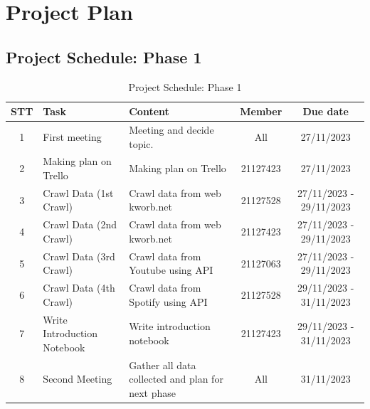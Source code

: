 \documentclass[13pt]{article}
\begin{document}
\section{Project Plan}

\subsection{Project Schedule: Phase 1}
\begin{table}[h]
    \centering
    \begin{tabular}{|c|p{4cm}|p{5cm}|c|c|}
    \hline
       \textbf{STT} & \textbf{Task} & \textbf{Content} & \textbf{Member} & \textbf{Due date}\\
    \hline
        1 & First meeting & Meeting and decide topic. & All & 27/11/2023\\
    \hline
        2 & Making plan on Trello & Making plan on Trello & 21127423 & 27/11/2023\\
    \hline
        3 & Crawl Data (1st Crawl) & Crawl data from web kworb.net & 21127528 & 27/11/2023 - 29/11/2023\\
    \hline
        4 & Crawl Data (2nd Crawl) & Crawl data from web kworb.net & 21127423 & 27/11/2023 - 29/11/2023\\
    \hline
        5 & Crawl Data (3rd Crawl) & Crawl data from Youtube using API & 21127063 & 27/11/2023 - 29/11/2023\\
    \hline
        6 & Crawl Data (4th Crawl) & Crawl data from Spotify using API & 21127528 & 29/11/2023 - 31/11/2023\\
    \hline
        7 & Write Introduction Notebook & Write introduction notebook & 21127423 & 29/11/2023 - 31/11/2023\\
    \hline
        8 & Second Meeting & Gather all data collected and plan for next phase & All & 31/11/2023\\
    \hline
    \end{tabular}
    \caption{Project Schedule: Phase 1}
    \label{tab:mytable}
\end{table}
\end{document}
